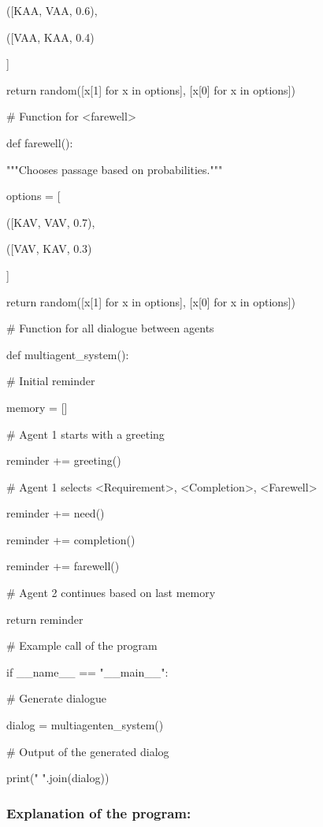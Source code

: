 \documentclass[
]{article}
\begin{document}
({[}\textquotesingle KAA\textquotesingle,
\textquotesingle VAA\textquotesingle{]}, 0.6),

({[}\textquotesingle VAA\textquotesingle,
\textquotesingle KAA\textquotesingle{]}, 0.4)

{]}

return random({[}x{[}1{]} for x in options{]}, {[}x{[}0{]} for x in
options{]})

\# Function for \textless farewell\textgreater{}

def farewell():

"""Chooses passage based on probabilities."""

options = {[}

({[}\textquotesingle KAV\textquotesingle,
\textquotesingle VAV\textquotesingle{]}, 0.7),

({[}\textquotesingle VAV\textquotesingle,
\textquotesingle KAV\textquotesingle{]}, 0.3)

{]}

return random({[}x{[}1{]} for x in options{]}, {[}x{[}0{]} for x in
options{]})

\# Function for all dialogue between agents

def multiagent\_system():

\# Initial reminder

memory = {[}{]}

\# Agent 1 starts with a greeting

reminder += greeting()

\# Agent 1 selects \textless Requirement\textgreater,
\textless Completion\textgreater, \textless Farewell\textgreater{}

reminder += need()

reminder += completion()

reminder += farewell()

\# Agent 2 continues based on last memory

return reminder

\# Example call of the program

if \_\_name\_\_ == "\_\_main\_\_":

\# Generate dialogue

dialog = multiagenten\_system()

\# Output of the generated dialog

print(" ".join(dialog))

\subsubsection{\texorpdfstring{\textbf{Explanation of the
program:}}{Explanation of the program:}}\label{explanation-of-the-program-2}
\end{document}
